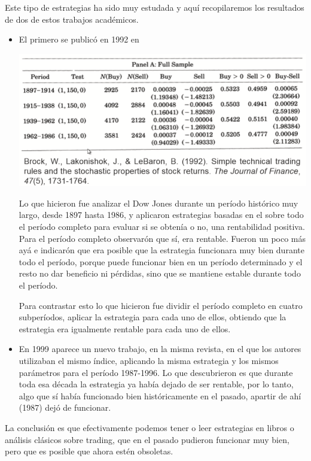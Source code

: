 Este tipo de estrategias ha sido  muy estudada y aquí recopilaremos los resultados de dos de estos trabajos académicos. 

\begin{itemize}
    \item El primero se publicó en 1992 en 
    \begin{center}
        \includegraphics[scale=.65]{images/mod03-21.png}
    \end{center}
    Lo que hicieron fue analizar el Dow Jones durante un período histórico muy largo, desde 1897 hasta 1986, y aplicaron estrategias basadas en el  sobre todo el período completo para evaluar si se obtenía o no, una rentabilidad positiva. Para el período completo observarón que sí, era rentable. Fueron un poco más ayá e indicarón que era posible que la estrategia funcionara muy bien durante todo el período, porque puede funcionar bien en un período determinado y el resto no dar beneficio ni pérdidas, sino que se mantiene estable durante todo el período. 
    
    Para contrastar esto lo que hicieron fue dividir el período completo en cuatro subperíodos, aplicar la estrategia para cada uno de ellos, obtiendo que la estrategia era igualmente rentable para cada uno de ellos.
    \item En 1999 aparece un nuevo trabajo, en la misma revista, en el que los autores utilizaban el mismo índice, aplicando la misma estrategia y los mismos parámetros para el período 1987-1996. Lo que descubrieron es que durante toda esa década la estrategia ya había dejado de ser rentable, por lo tanto, algo que sí había funcionado bien históricamente en el pasado, apartir de ahí (1987) dejó de funcionar.
\end{itemize}
La conclusión es que efectivamente podemos tener o leer estrategias en libros o análisis clásicos sobre trading, que en el pasado pudieron funcionar muy bien, pero que es posible que ahora estén obsoletas.

